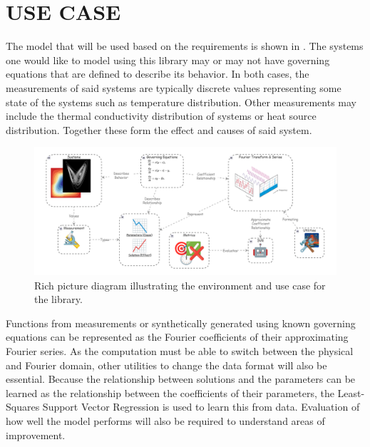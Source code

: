 \chapter{USE CASE}
The model that will be used based on the requirements is shown in . The systems one would like to model using this library may or may not have governing equations that are defined to describe its behavior. In both cases, the measurements of said systems are typically discrete values representing some state of the systems such as temperature distribution. Other measurements may include the thermal conductivity distribution of systems or heat source distribution. Together these form the effect and causes of said system.
\begin{figure}[H]
    \centering
    \includegraphics[width=1.0\linewidth]{figures/rich_picture.png}
    \caption{Rich picture diagram illustrating the environment and use case for the library.}\label{fig:rich_picture}
\end{figure}

Functions from measurements or synthetically generated using known governing equations can be represented as the Fourier coefficients of their approximating Fourier series. As the computation must be able to switch between the physical and Fourier domain, other utilities to change the data format will also be essential. Because the relationship between solutions and the parameters can be learned as the relationship between the coefficients of their parameters, the Least-Squares Support Vector Regression is used to learn this from data. Evaluation of how well the model performs will also be required to understand areas of improvement.
